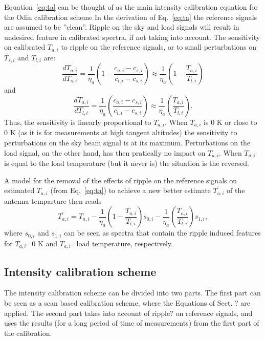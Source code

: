 Equation~\ref{eq:ta} can be thought of as the main intensity
calibration equation for the Odin  calibration scheme
In the derivation of Eq.~\ref{eq:ta}
the reference signals are assumed to be ''clean''.
Ripple on the sky and load signals will
result in undesired feature in calibrated
spectra, if not taking into account.
The sensitivity on calibrated \(T_{a,i}\) to ripple on the reference signals,
or to small perturbations on \(T_{s,i}\) and \(T_{l,i}\) are:
\begin{equation}
\frac{dT_{a,i}}{dT_{s,i}}=\frac{1}{\eta_{a}}\left(1-\frac{c_{a,i}-c_{s,i}}{c_{l,i}-c_{s,i}}\right)\approx \frac{1}{\eta_{a}}\left(1-\frac{T_{a,i}}{T_{l,i}}\right)
\end{equation}
and
\begin{equation}
\frac{dT_{a,i}}{dT_{l,i}}=\frac{1}{\eta_{a}}\left(\frac{c_{a,i}-c_{s,i}}{c_{l,i}-c_{s,i}}\right)\approx \frac{1}{\eta_{a}}\left(\frac{T_{a,i}}{T_{l,i}}\right).
\end{equation}
Thus, the sensitivity is linearly proportional to \(T_{a,i}\).
When \(T_{a,i}\) is 0 K or close to 0 K (as it is for measurements at high
tangent altitudes) the sensitivity to perturbations on
the sky beam signal is at its maximum.
Perturbations on the load signal, on the other hand, has then pratically
no impact on \(T_{a,i}\).
When \(T_{a,i}\) is equal to the load temperature (but it never is)
the situation is the reversed.

A model for the removal of the effects of ripple on the reference signals
on estimated \(T_{a,i}\) (from Eq.~\ref{eq:ta}) to achieve a new
better estimate \(T^{'}_{a,i}\) of the antenna temparture then reads
\begin{equation}
\label{correction}
T^{'}_{a,i}=T_{a,i}-\frac{1}{\eta_{a}}\left(1-\frac{T_{a,i}}{T_{l,i}}\right) s_{0,i}-
 \frac{1}{\eta_{a}}\left(\frac{T_{a,i}}{T_{l,i}}\right) s_{1,i},
\end{equation}
where \(s_{0,i}\) and \(s_{1,i}\) can be seen as spectra that contain
the ripple induced features for \(T_{a,i}\)=0 K and \(T_{a,i}\)=load temperature,
respectively.

\subsection{Intensity calibration scheme} 

The intensity calibration scheme can be divided into two parts. The first part can be
seen as a scan based calibration scheme, where the Equations of Sect. ? are applied.
The second part takes into account of ripple? on reference signals, and uses the results
(for a long period of time of measurements) from the first part of the calibration.


